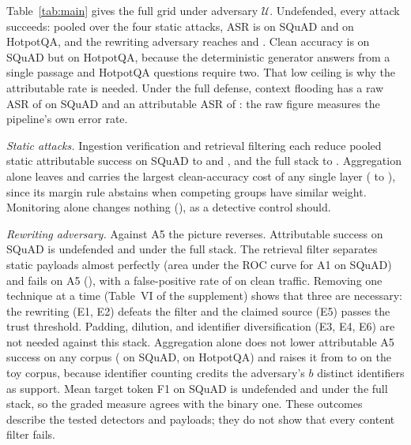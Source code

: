 \documentclass[lettersize,journal]{IEEEtran}
\newcommand{\AdvU}{\mathcal{U}}
\begin{document}
Table~\ref{tab:main} gives the full grid under adversary $\AdvU$. Undefended, every attack
succeeds: pooled over the four static attacks, ASR is \asrStaticSquadnone{} on SQuAD and
\asrStaticHotpotqanone{} on HotpotQA, and the rewriting adversary reaches
\asrAdaptiveSquadnone{} and \asrAdaptiveHotpotqanone{}. Clean accuracy is
\cleanAccSquadnone{} on SQuAD but \cleanAccHotpotqanone{} on HotpotQA, because the
deterministic generator answers from a single passage and HotpotQA questions require two. That
low ceiling is why the attributable rate is needed. Under the full defense, context flooding
has a raw ASR of \asrFloodingSquadfull{} on SQuAD and an attributable ASR of
\casrFloodingSquadfull{}: the raw figure measures the pipeline's own error rate.



\emph{Static attacks.} Ingestion verification and retrieval filtering each reduce pooled
static attributable success on SQuAD to \casrStaticSquadLOne{} and \casrStaticSquadLTwo{}, and
the full stack to \casrStaticSquadfull{}. Aggregation alone leaves
\casrStaticSquadLThree{} and carries the largest clean-accuracy cost of any single layer
(\cleanAccSquadnone{} to \cleanAccSquadLThree{}), since its margin rule abstains when
competing groups have similar weight. Monitoring alone changes nothing
(\casrStaticSquadLFour{}), as a detective control should.

\emph{Rewriting adversary.} Against A5 the picture reverses. Attributable success on SQuAD is
\casrAdaptiveSquadnone{} undefended and \casrAdaptiveSquadfull{} under the full stack. The
retrieval filter separates static payloads almost perfectly (area under the ROC curve
\detectionAurocPoisonedragSquad{} for A1 on SQuAD) and fails on A5
(\detectionAurocAdaptiveSquad{}), with a false-positive rate of \detectionFprSquad{} on clean
traffic. Removing one technique at a time (Table~VI of the supplement) shows that three are
necessary: the rewriting (E1, E2) defeats the filter and the claimed source (E5) passes the
trust threshold. Padding, dilution, and identifier diversification (E3, E4, E6) are not
needed against this stack. Aggregation alone does not lower attributable A5 success on any corpus
(\casrAdaptiveSquadLThree{} on SQuAD, \casrAdaptiveHotpotqaLThree{} on HotpotQA) and raises it
from \casrAdaptiveToynone{} to \casrAdaptiveToyLThree{} on the toy corpus, because identifier
counting credits the adversary's $b$ distinct identifiers as support. Mean target token F1 on SQuAD is \targetTokenFAdaptiveSquadNone{} undefended and
\targetTokenFAdaptiveSquadFull{} under the full stack, so the graded measure agrees with the
binary one. These outcomes describe the tested detectors and payloads; they do not show that
every content filter fails.
\end{document}
